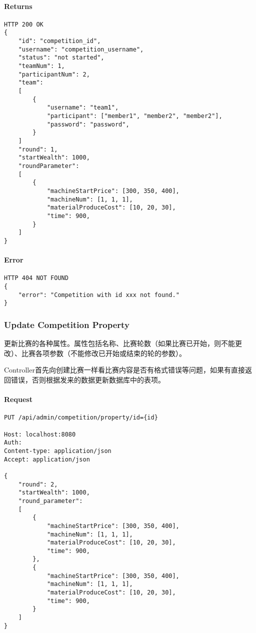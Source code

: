 \documentclass{article}
\begin{document}
\paragraph*{Returns}
\begin{lstlisting}
HTTP 200 OK
{
    "id": "competition_id",
    "username": "competition_username",
    "status": "not started",
    "teamNum": 1,
    "participantNum": 2,
    "team":
    [
        {
            "username": "team1",
            "participant": ["member1", "member2", "member2"],
            "password": "password",
        }
    ]
    "round": 1,
    "startWealth": 1000,
    "roundParameter":
    [
        {
            "machineStartPrice": [300, 350, 400],
            "machineNum": [1, 1, 1],
            "materialProduceCost": [10, 20, 30],
            "time": 900,
        }
    ]
}

\end{lstlisting}

\paragraph*{Error}
\begin{lstlisting}
HTTP 404 NOT FOUND
{
    "error": "Competition with id xxx not found."
}
\end{lstlisting}

\subsubsection{Update Competition Property}

更新比赛的各种属性。属性包括名称、比赛轮数（如果比赛已开始，则不能更改）、比赛各项参数（不能修改已开始或结束的轮的参数）。

Controller首先向创建比赛一样看比赛内容是否有格式错误等问题，如果有直接返回错误，否则根据发来的数据更新数据库中的表项。

\paragraph*{Request}
\begin{lstlisting}
PUT /api/admin/competition/property/id={id}

Host: localhost:8080
Auth:
Content-type: application/json
Accept: application/json

{
    "round": 2,
    "startWealth": 1000,
    "round_parameter":
    [
        {
            "machineStartPrice": [300, 350, 400],
            "machineNum": [1, 1, 1],
            "materialProduceCost": [10, 20, 30],
            "time": 900,
        },
        {
            "machineStartPrice": [300, 350, 400],
            "machineNum": [1, 1, 1],
            "materialProduceCost": [10, 20, 30],
            "time": 900,
        }
    ]
}
\end{lstlisting}
\end{document}
